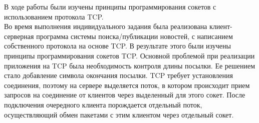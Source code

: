 В ходе работы были изучены принципы программирования сокетов с использованием протокола TCP.\\
Во время выполнения индивидуального задания была реализована клиент-серверная программа системы поиска/публикации новостей, с написанием собственного протокола на основе TCP. 
В результате этого были изучены принципы программирования сокетов TCP. Основной проблемой при реализации приложения на TCP была необходимость контроля длины посылки. Ее решением стало добавление символа окончания посылки. TCP требует установления соединения, поэтому на сервере выделяется поток, в котором происходит прием запросов на соединение от клиентов через выделенный для этого сокет. После подключения очередного клиента порождается отдельный поток, осуществляющий обмен пакетами с этим клиентом через отдельный сокет. 



